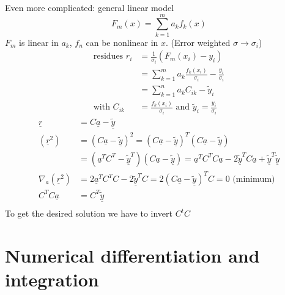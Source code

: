 Even more complicated: general linear model
\begin{equation*}
    F_m(x) = \sum_{k=1}^{m} a_k f_k(x)
\end{equation*}
$F_m$ is linear in $a_k$, $f_n$ can be nonlinear in $x$.
(Error weighted $\sigma \to \sigma_i$)
\begin{align*}
    \text{residues } r_i &= \frac{1}{\sigma_i}(F_m(x_i) - y_i)\\
    &= \sum_{k=1}^{m} a_k \frac{f_k(x_i)}{\sigma_i}- \frac{y_i}{\sigma_i} \\
    &= \sum_{k=1}^{n} a_k C_{ik} - \tilde{y}_i\\
    \text{with } C_{ik} &= \frac{f_k(x_i)}{\sigma_i} \text{ and } \tilde{y}_i = \frac{y_i}{\sigma_i}
\end{align*}
\begin{align*}
    \underline{r} &= C \underline{a} - \underline{\tilde{y}}\\
    (\underline{r}^2) &= (C \underline{a} - \underline{\tilde{y}})^2
    =(C \underline{a} - \underline{\tilde{y}})^T (C \underline{a} - \underline{\tilde{y}})\\
    &= (\underline{a}^T C^T - \underline{\tilde{y}}^T) (C \underline{a} - \underline{\tilde{y}})
    = \underline{a}^T C^T C \underline{a}  - 2 \underline{\tilde{y}}^T C \underline{a} + \underline{\tilde{y}}^T \underline{\tilde{y}}\\
    \nabla_a (\underline{r}^2)
    &= 2 \underline{a}^T C^T C - 2 \underline{\tilde{y}}^T C
    = 2 ( C \underline{a} - \underline{\tilde{y}})^T C = 0 \text{ (minimum)}\\
    C^T C \underline{a} &= C^T \underline{\tilde{y}}\\
\end{align*}
To get the desired solution we have to invert $C^t C$


\chapter{Numerical differentiation and integration}\label{ch:numerical-differentiation-and-integration}


